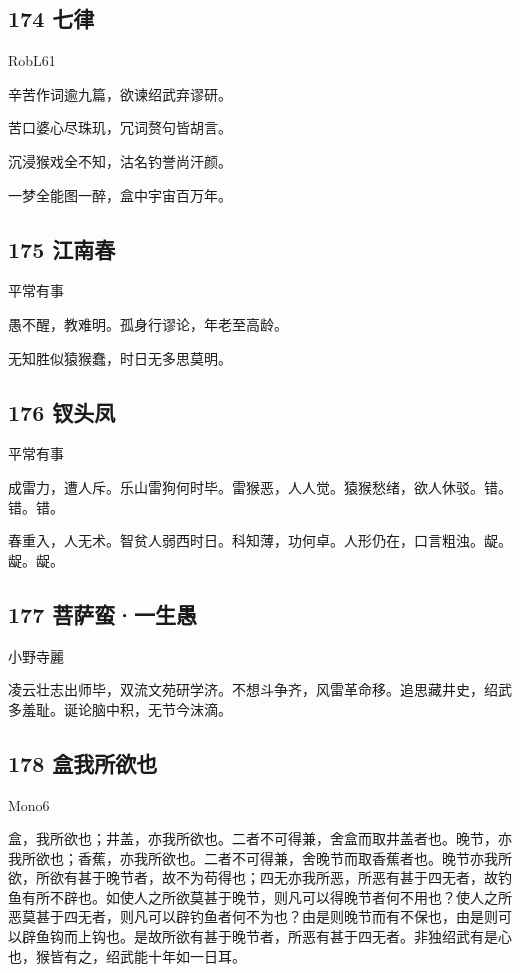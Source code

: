 \hypertarget{ux4e03ux5f8b}{%
\subsection{174 七律}\label{ux4e03ux5f8b}}

RobL61

辛苦作词逾九篇，欲谏绍武弃谬研。

苦口婆心尽珠玑，冗词赘句皆胡言。

沉浸猴戏全不知，沽名钓誉尚汗颜。

一梦全能图一醉，盒中宇宙百万年。

\hypertarget{ux6c5fux5357ux6625}{%
\subsection{175 江南春}\label{ux6c5fux5357ux6625}}

平常有事

愚不醒，教难明。孤身行谬论，年老至高龄。

无知胜似猿猴蠢，时日无多思莫明。

\hypertarget{ux9497ux5934ux51e4}{%
\subsection{176 钗头凤}\label{ux9497ux5934ux51e4}}

平常有事

成雷力，遭人斥。乐山雷狗何时毕。雷猴恶，人人觉。猿猴愁绪，欲人休驳。错。错。错。

春重入，人无术。智贫人弱西时日。科知薄，功何卓。人形仍在，口言粗浊。龊。龊。龊。

\hypertarget{ux83e9ux8428ux86eeux4e00ux751fux611a}{%
\subsection{177
菩萨蛮·一生愚}\label{ux83e9ux8428ux86eeux4e00ux751fux611a}}

小野寺麗

凌云壮志出师毕，双流文苑研学济。不想斗争齐，风雷革命移。追思藏井史，绍武多羞耻。诞论脑中积，无节今沫滴。

\hypertarget{ux76d2ux6211ux6240ux6b32ux4e5f}{%
\subsection{178 盒我所欲也}\label{ux76d2ux6211ux6240ux6b32ux4e5f}}

Mono6

盒，我所欲也；井盖，亦我所欲也。二者不可得兼，舍盒而取井盖者也。晚节，亦我所欲也；香蕉，亦我所欲也。二者不可得兼，舍晚节而取香蕉者也。晚节亦我所欲，所欲有甚于晚节者，故不为苟得也；四无亦我所恶，所恶有甚于四无者，故钓鱼有所不辟也。如使人之所欲莫甚于晚节，则凡可以得晚节者何不用也？使人之所恶莫甚于四无者，则凡可以辟钓鱼者何不为也？由是则晚节而有不保也，由是则可以辟鱼钩而上钩也。是故所欲有甚于晚节者，所恶有甚于四无者。非独绍武有是心也，猴皆有之，绍武能十年如一日耳。

